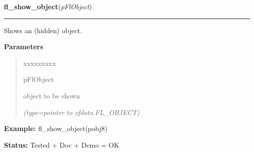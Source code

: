     \label{xformslib:flbasic:fl_show_object}

    \vspace{0.5ex}

\hspace{.8\funcindent}\begin{boxedminipage}{\funcwidth}

    \raggedright \textbf{fl\_show\_object}(\textit{pFlObject})

    \vspace{-1.5ex}

    \rule{\textwidth}{0.5\fboxrule}
\setlength{\parskip}{2ex}
    Shows an (hidden) object.

\setlength{\parskip}{1ex}
      \textbf{Parameters}
      \vspace{-1ex}

      \begin{quote}
        \begin{Ventry}{xxxxxxxxx}

          \item[pFlObject]

          object to be shown

            {\it (type=pointer to xfdata.FL\_OBJECT)}

        \end{Ventry}

      \end{quote}

\textbf{Example:} fl\_show\_object(pobj8)



\textbf{Status:} Tested + Doc + Demo = OK



    \end{boxedminipage}

    \label{xformslib:flbasic:fl_hide_object}

    \vspace{0.5ex}

